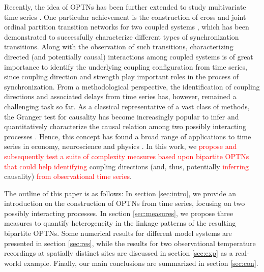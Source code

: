\documentclass[12pt,aip,cha,reprint,nofootinbib]{revtex4-1}
\begin{document}
Recently, the idea of OPTNs has been further extended to study multivariate time series \cite{zhangSciRep2017}. One particular achievement is the construction of cross and joint ordinal partition transition networks for two coupled systems \cite{Guo2018}, which has been demonstrated to successfully characterize different types of synchronization transitions. Along with the observation of such transitions, characterizing directed (and potentially causal) interactions among coupled systems is of great importance to identify the underlying coupling configuration from time series, since coupling direction and strength play important roles in the process of synchronization. From a methodological perspective, the identification of coupling directions and associated delays \cite{Coufal2017} from time series has, however, remained a challenging task so far. As a classical representative of a vast class of methods, the Granger test for causality has become increasingly popular to infer and quantitatively characterize the causal relation among two possibly interacting processes \cite{Granger1969}. Hence, this concept has found a broad range of applications to time series in economy, neuroscience and physics \cite{Ding_Book_2007,Dhamala_prl2008}. In this work, we \textcolor{red}{propose and subsequently test a suite of complexity measures based upon bipartite OPTNs that could help identifying} coupling directions (and, thus, potentially \textcolor{red}{inferring} causality) \textcolor{red}{from observational time series}. 

The outline of this paper is as follows: In section \ref{sec:intro}, we provide an introduction on the construction of OPTNs from time series, focusing on two possibly interacting processes. In section \ref{sec:measures}, we propose three measures to quantify heterogeneity in the linkage patterns of the resulting bipartite OPTNs. Some numerical results for different model systems are presented in section \ref{sec:res}, while the results for two observational temperature recordings at spatially distinct sites are discussed in section \ref{sec:exp} as a real-world example. Finally, our main conclusions are summarized in section \ref{sec:con}. 
\end{document}
